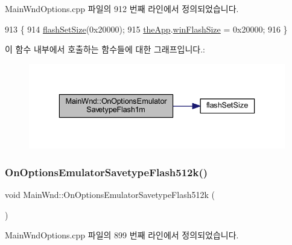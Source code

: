 Main\+Wnd\+Options.\+cpp 파일의 912 번째 라인에서 정의되었습니다.


\begin{DoxyCode}
913 \{
914   \mbox{\hyperlink{_flash_8cpp_a4d0a651a0b5a03da845c2fd023bef403}{flashSetSize}}(0x20000);
915   \mbox{\hyperlink{_v_b_a_8cpp_a8095a9d06b37a7efe3723f3218ad8fb3}{theApp}}.\mbox{\hyperlink{class_v_b_a_a5c99844bc4d1e5556434afaa75ae91e5}{winFlashSize}} = 0x20000;
916 \}
\end{DoxyCode}
이 함수 내부에서 호출하는 함수들에 대한 그래프입니다.\+:
\nopagebreak
\begin{figure}[H]
\begin{center}
\leavevmode
\includegraphics[width=336pt]{class_main_wnd_ac70aeadfab0e7ed9120a03f11564f56c_cgraph}
\end{center}
\end{figure}
\mbox{\label{class_main_wnd_a10c98fcb234998c2d621585d4b244451}} 
\subsubsection{\texorpdfstring{On\+Options\+Emulator\+Savetype\+Flash512k()}{OnOptionsEmulatorSavetypeFlash512k()}}
{\footnotesize\ttfamily void Main\+Wnd\+::\+On\+Options\+Emulator\+Savetype\+Flash512k (\begin{DoxyParamCaption}{ }\end{DoxyParamCaption})\hspace{0.3cm}{\ttfamily [protected]}}



Main\+Wnd\+Options.\+cpp 파일의 899 번째 라인에서 정의되었습니다.


